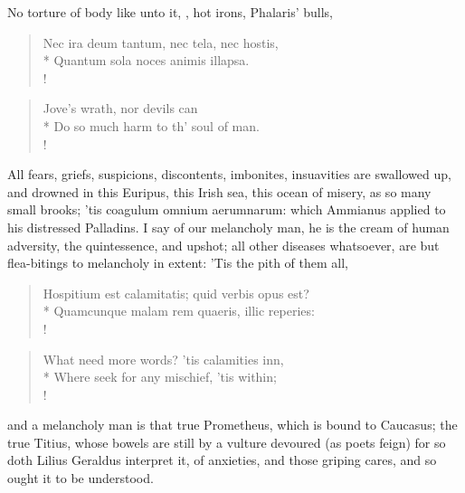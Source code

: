 No torture of body like unto it, , hot irons, Phalaris' bulls,

\begin{latin}%
\begin{verse}%
Nec ira deum tantum, nec tela, nec hostis,\\*
Quantum sola noces animis illapsa.\\!
\end{verse}%
\end{latin}%
\translationrule%
\begin{verse}%
Jove's wrath, nor devils can\\*
Do so much harm to th' soul of man.\\!
\end{verse}%
%

All fears, griefs, suspicions, discontents, imbonites, insuavities are
swallowed up, and drowned in this Euripus, this Irish sea, this ocean
of misery, as so many small brooks; 'tis coagulum omnium aerumnarum:
which Ammianus applied to his distressed Palladins. I say of our
melancholy man, he is the cream of human adversity, the 
quintessence, and upshot; all other diseases whatsoever, are but
flea-bitings to melancholy in extent: 'Tis the pith of them all,
%
\begin{latin}%
\begin{verse}%
Hospitium est calamitatis; quid verbis opus est?\\*
Quamcunque malam rem quaeris, illic reperies:\\!
\end{verse}%
\end{latin}%
\translationrule%
\begin{verse}%
What need more words? 'tis calamities inn,\\*
Where seek for any mischief, 'tis within;\\!
\end{verse}%
%
%
and a melancholy man is that true Prometheus, which is bound to
Caucasus; the true Titius, whose bowels are still by a vulture devoured
(as poets feign) for so doth Lilius Geraldus interpret it, of
anxieties, and those griping cares, and so ought it to be understood.

